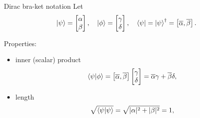 \begin{frame}{Dirac bra-ket notation}
    Let 
    \begin{equation*}
        \ket{\psi} = %
        \begin{bmatrix}
            \alpha \\
            \beta
        \end{bmatrix},
        \quad 
        \ket{\phi} = %
        \begin{bmatrix}
            \gamma \\
            \delta
        \end{bmatrix},
        \quad 
        \bra{\psi} = \ket{\psi}^\dagger = \begin{bmatrix}
            \overline{\alpha}, \overline{\beta} 
        \end{bmatrix}.
    \end{equation*}
    
    Properties:
    \begin{itemize}
        \item inner (scalar) product
        \begin{equation*}
            \braket{\psi}{\phi}
            = 
            \begin{bmatrix}
                \overline{\alpha}, \overline{\beta} 
            \end{bmatrix}
            \begin{bmatrix}
                \gamma \\
                \delta
            \end{bmatrix}
            =\overline{\alpha} \gamma +  \overline{\beta} \delta,
        \end{equation*}
        
        \item length
        \begin{equation*}
            \sqrt{\braket{\psi}{\psi}}
                    = \sqrt{|\alpha|^2 +  |\beta|^2} = 1,
                \end{equation*}
                

\end{itemize}
\end{frame}
